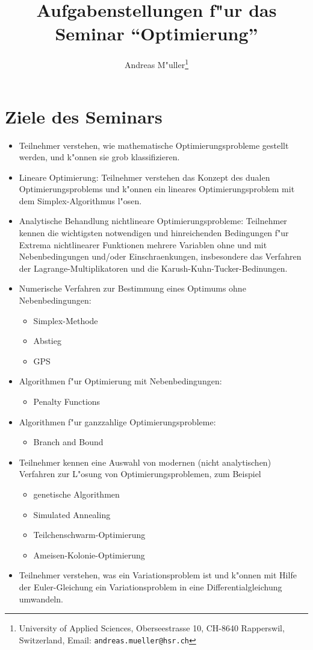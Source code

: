 \documentclass[a4paper,12pt]{article}
\begin{document}
\title{Aufgabenstellungen f"ur das Seminar ``Optimierung''}
\author{Andreas M"uller\footnote{
University of Applied Sciences, Oberseestrasse 10, CH-8640 Rapperswil,
Switzerland, Email: {\tt andreas.mueller@hsr.ch}}}
\date{}
\maketitle
\section{Ziele des Seminars}
\begin{itemize}
\item
Teilnehmer verstehen, wie mathematische Optimierungsprobleme gestellt
werden, und k"onnen sie grob klassifizieren.
\item
Lineare Optimierung: Teilnehmer verstehen das Konzept des dualen
Optimierungsproblems und k"onnen ein lineares Optimierungsproblem
mit dem Simplex-Algorithmus l"osen.
\item
Analytische Behandlung nichtlineare Optimierungsprobleme:  Teilnehmer
kennen die wichtigsten notwendigen und hinreichenden Bedingungen f"ur
Extrema nichtlinearer Funktionen mehrere Variablen ohne und mit
Nebenbedingungen und/oder Einschraenkungen, insbesondere das Verfahren
der Lagrange-Multiplikatoren und die Karush-Kuhn-Tucker-Bedinungen.
\item
Numerische Verfahren zur Bestimmung eines Optimums ohne Nebenbedingungen:
\begin{itemize}
\item Simplex-Methode
\item Abstieg
\item GPS
\end{itemize}
\item
Algorithmen f"ur Optimierung mit Nebenbedingungen:
\begin{itemize}
\item Penalty Functions
\end{itemize}

\item
Algorithmen f"ur ganzzahlige Optimierungsprobleme:
\begin{itemize}
\item Branch and Bound
\end{itemize}

\item
Teilnehmer kennen eine Auswahl von modernen (nicht analytischen) Verfahren
zur L"osung von Optimierungsproblemen, zum Beispiel
\begin{itemize}
\item genetische Algorithmen
\item Simulated Annealing
\item Teilchenschwarm-Optimierung
\item Ameisen-Kolonie-Optimierung
\end{itemize}

\item
Teilnehmer verstehen, was ein Variationsproblem ist und k"onnen mit
Hilfe der Euler-Gleichung ein Variationsproblem in eine
Differentialgleichung umwandeln.
\end{itemize}
\end{document}
